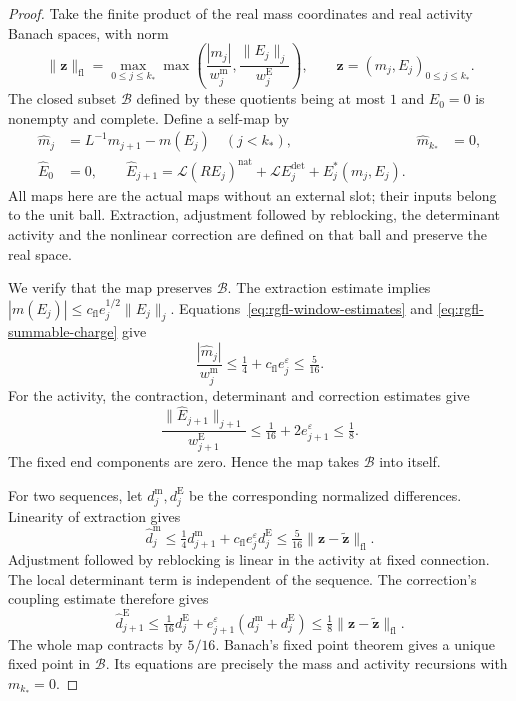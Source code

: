 \begin{proof}
Take the finite product of the real mass coordinates
and real activity Banach spaces, with norm
\[
 \|\mathbf z\|_{\mathrm{fl}}
   =\max_{0\le j\le k_*}
       \max\left(\frac{|m_j|}{w_j^{\mathrm m}},
                              \frac{\|E_j\|_j}{w_j^{\mathrm E}}\right),
                  \qquad \mathbf z=(m_j,E_j)_{0\le j\le k_*}.
\]
The closed subset $\mathcal B$ defined by these
quotients being at most $1$ and $E_0=0$
is nonempty and complete. Define a self-map by
\begin{align}
 \widehat m_j&=L^{-1}m_{j+1}-m(E_j)\quad(j<k_*),
                 &\widehat m_{k_*}&=0, \nonumber\\
 \widehat E_0&=0,\qquad
 \widehat E_{j+1}
       =\mathcal L(RE_j)^{\mathrm{nat}}
                    +\mathcal LE_j^{\mathrm{det}}+E_j^*(m_j,E_j).
                                      \label{eq:rgfl-fixed-point-map}
\end{align}
All maps here are the actual maps without an external
slot; their inputs belong to the unit ball.
Extraction, adjustment followed by reblocking,
the determinant activity and the nonlinear correction
are defined on that ball and preserve the real space.

We verify that the map preserves $\mathcal B$.
The extraction estimate implies
$|m(E_j)|\le c_{\mathrm{fl}}e_j^{1/2}\|E_j\|_j$.
Equations~\eqref{eq:rgfl-window-estimates} and
\eqref{eq:rgfl-summable-charge} give
\[
 \frac{|\widehat m_j|}{w_j^{\mathrm m}}
                    \le\tfrac14+c_{\mathrm{fl}}e_j^\varepsilon
                    \le\tfrac5{16}.
\]
For the activity, the contraction, determinant and
correction estimates give
\[
 \frac{\|\widehat E_{j+1}\|_{j+1}}{w_{j+1}^{\mathrm E}}
                         \le\tfrac1{16}+2e_{j+1}^\varepsilon
                         \le\tfrac18 .
\]
The fixed end components are zero. Hence the map
takes $\mathcal B$ into itself.

For two sequences, let $d_j^{\mathrm m},d_j^{\mathrm E}$
be the corresponding normalized differences.
Linearity of extraction gives
\[
 \widehat d_j^{\mathrm m}
      \le\tfrac14d_{j+1}^{\mathrm m}
                            +c_{\mathrm{fl}}e_j^\varepsilon d_j^{\mathrm E}
      \le\tfrac5{16}\|\mathbf z-\widetilde{\mathbf z}\|_{\mathrm{fl}} .
\]
Adjustment followed by reblocking is linear in
the activity at fixed connection.
The local determinant term is independent of the
sequence. The correction's coupling estimate
 therefore gives
\[
 \widehat d_{j+1}^{\mathrm E}
      \le\tfrac1{16}d_j^{\mathrm E}
                         +e_{j+1}^\varepsilon
                                      (d_j^{\mathrm m}+d_j^{\mathrm E})
      \le\tfrac18\|\mathbf z-\widetilde{\mathbf z}\|_{\mathrm{fl}} .
\]
The whole map contracts by $5/16$.
Banach's fixed point theorem
\cite[Theorem~8]{BrightMetric2023} gives a unique
fixed point in $\mathcal B$.
Its equations are precisely the mass and activity
recursions with $m_{k_*}=0$.


\end{proof}
